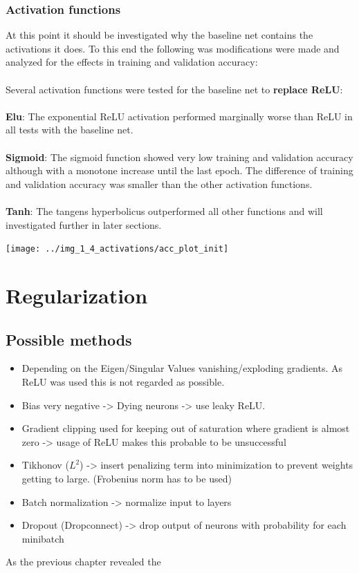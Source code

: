 \documentclass{article}
\newenvironment{Figure}
{\par\medskip\noindent\minipage{\linewidth}}
{\endminipage\par\medskip}
\begin{document}
\begin{multicols}{2}
\subsubsection{Activation functions}
At this point it should be investigated why the baseline net contains the activations it does. To this end the following was modifications were made and analyzed for the effects in training and validation accuracy:\\
\\
Several activation functions were tested for the baseline net to \textbf{replace ReLU}:\\
\\
\textbf{Elu}: The exponential ReLU activation performed marginally worse than ReLU in all tests with the baseline net.\\
\\
\textbf{Sigmoid}: The sigmoid function showed very low training and validation accuracy although with a monotone increase until the last epoch. The difference of training and validation accuracy was smaller than the other activation functions. \\
\\
\textbf{Tanh}: The tangens hyperbolicus outperformed all other functions and will investigated further in later sections.

\begin{Figure}
	\label{fig:known_init}
	\centering
	\texttt{[image: ../img\_1\_4\_activations/acc\_plot\_init]}
\end{Figure}

\section{Regularization}
\label{regularization}
\subsection{Possible methods}
\begin{itemize}
	\item Depending on the Eigen/Singular Values vanishing/exploding gradients. As ReLU was used this is not regarded as possible.\\
	\item Bias very negative -> Dying neurons -> use leaky ReLU.
	\item Gradient clipping used for keeping out of saturation where gradient is almost zero -> usage of ReLU makes this probable to be unsuccessful
	\item Tikhonov ($L^{2}$) -> insert penalizing term into minimization to prevent weights getting to large. (Frobenius norm has to be used)
	\item Batch normalization -> normalize input to layers
	\item Dropout (Dropconnect) -> drop output of neurons with probability for each minibatch
\end{itemize}
As the previous chapter revealed the 


\end{multicols}
\end{document}
